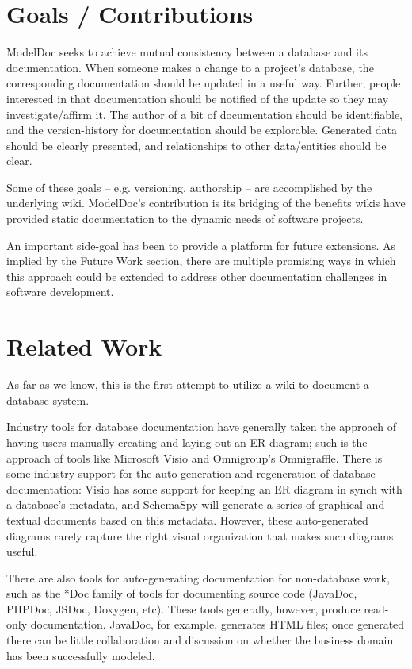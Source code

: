 \documentclass{acm_proc_article-sp}
\begin{document}
\section{Goals / Contributions}

ModelDoc seeks to achieve mutual consistency between a database and its
documentation.  When someone makes a change to a project's database, the
corresponding documentation should be updated in a useful way.  Further, people
interested in that documentation should be notified of the update so they may
investigate/affirm it.  The author of a bit of documentation should be
identifiable, and the version-history for documentation should be explorable. 
Generated data should be clearly presented, and relationships to other
data/entities should be clear.

Some of these goals -- e.g. versioning, authorship -- are accomplished by the
underlying wiki.  ModelDoc's contribution is its bridging of the benefits
wikis have provided static documentation to the dynamic needs of software
projects.

An important side-goal has been to provide a platform for future extensions. 
As implied by the Future Work section, there are multiple promising ways in
which this approach could be extended to address other documentation challenges
in software development.

\section{Related Work}
As far as we know, this is the first attempt to utilize a wiki to document a
database system.

Industry tools for database documentation have generally taken the approach of
having users manually creating and laying out an ER diagram; such is
the approach of tools like Microsoft Visio and Omnigroup's Omnigraffle.  There
is some industry support for the auto-generation and regeneration of database
documentation: Visio has some support for keeping an ER diagram in synch with a
database's metadata, and SchemaSpy will generate a series of graphical and
textual documents based on this metadata. However, these auto-generated
diagrams rarely capture the right visual organization that makes such diagrams
useful.

There are also tools for auto-generating documentation for non-database work,
such as the *Doc family of tools for documenting source code (JavaDoc, PHPDoc,
JSDoc, Doxygen, etc).  These tools generally, however, produce read-only
documentation.  JavaDoc, for example, generates HTML files; once generated
there can be little collaboration and discussion on whether the business domain
has been successfully modeled.
\end{document}
